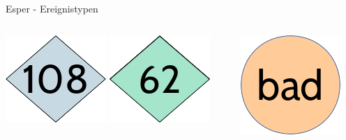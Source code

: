 \documentclass[usenames,dvipsnames]{beamer}
\begin{document}
\begin{frame}{Esper - Ereignistypen}
\begin{columns}   
    \begin{column}{0.5\textwidth}
        \begin{center}
            \hspace{1cm}\includegraphics[scale=0.3]{img/ereignis_aa1}
            \includegraphics[scale=0.3]{img/ereignis_a1}
        \end{center} 
    \end{column} 
    \begin{column}{0.5\textwidth}
        \begin{center}
            \includegraphics[scale=0.3]{img/ereignis_b1}
        \end{center}  
        
    \end{column}
\end{columns}
\end{frame}
\end{document}
